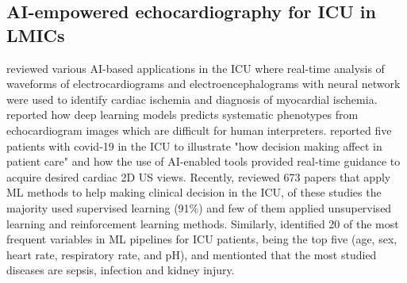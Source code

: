 \documentclass[mlabstract,twocolumn]{jmlr}
\begin{document}
\subsection{AI-empowered echocardiography for ICU in LMICs}
\citet{hanson2001} reviewed various AI-based applications in the ICU where real-time analysis of waveforms of electrocardiograms and electroencephalograms with neural network were used to identify cardiac ischemia and diagnosis of myocardial ischemia.
\citet{Ghorbani-DigitalMedicineNature-JAN2020} reported how deep learning models predicts systematic phenotypes from echocardiogram images which are difficult for human interpreters.
\citet{CHEEMA2021JACCCaseReports} reported five patients with covid-19 in the ICU to illustrate "how decision making affect in patient care" and how the use of AI-enabled tools provided real-time guidance to acquire desired cardiac 2D US views.
Recently, \citet{hong2022} reviewed 673 papers that apply ML methods to help making clinical decision in the ICU, of these studies the majority used supervised learning (91\%) and few of them applied unsupervised learning and reinforcement learning methods.
Similarly, \citet{hong2022} identified 20 of the most frequent variables in ML pipelines for ICU patients, being the top five (age, sex, heart rate, respiratory rate, and pH), 
and mentionted that the most studied diseases are sepsis, infection and kidney injury.
\end{document}
